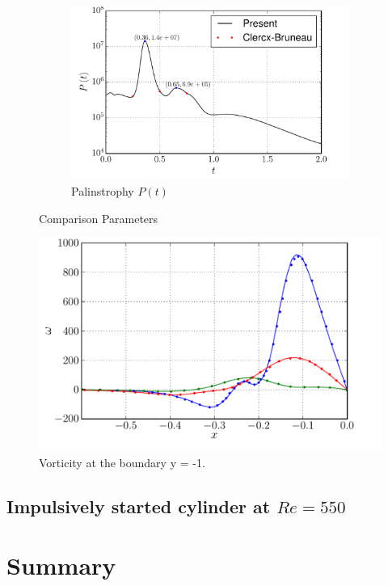 \begin{figure}[p]
     \begin{subfigure}[b]{0.6\textwidth}
             \includegraphics[width=\textwidth]{figures/eulerian/dipole_Palinstrophy_comparison.pdf}
             \caption{Palinstrophy $P(t)$}
             \label{fig:dipole_Palinstrophy_comparison}
     \end{subfigure}     
     \caption{Comparison Parameters}
     \label{fig:dipole_comparison}
	\end{figure}

	\begin{figure}[p]
	\centering
	\includegraphics[width=0.7\linewidth]{./figures/eulerian/VorticityAtBoundary.pdf}
	\caption{Vorticity at the boundary y = -1.}
	\label{fig:VorticityAtBoundary}
	\end{figure}
	




\subsection{Impulsively started cylinder at $Re=550$}

\section{Summary}

